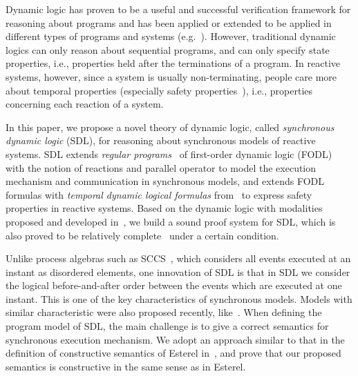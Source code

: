 \documentclass{fcs}
\begin{document}
Dynamic logic has proven to be a useful and successful verification framework for reasoning about programs and has been applied or extended to be applied in
different types of programs and systems (e.g.~\cite{Feldman84,Rustan07,Platzer07b,Platzer07}).
However, traditional dynamic logics can only reason about sequential programs, and can only specify state properties, i.e., properties held after the terminations of a program.
In reactive systems, however, since a system is usually non-terminating, people care more about temporal properties (especially safety properties~\cite{Halbwachs91}), i.e., properties concerning each reaction of a system.

In this paper, we propose a novel theory of dynamic logic, called \emph{synchronous dynamic logic} (SDL), for reasoning about synchronous models of reactive systems.
SDL extends \emph{regular programs}~\cite{Harel00} of first-order dynamic logic (FODL)~\cite{Harel79} with the notion of reactions and parallel operator to model the execution mechanism and communication in synchronous models,
and extends FODL formulas with \emph{temporal dynamic logical formulas} from~\cite{Platzer07} to express safety properties in reactive systems.
Based on the dynamic logic with modalities proposed and developed in~\cite{Beckert01},
we build a sound proof system for SDL, which is also proved to be relatively complete~\cite{Cook78} under a certain condition.

Unlike process algebras such as SCCS~\cite{Milner83}, which considers all events executed at an instant as disordered elements,
one innovation of SDL is that in SDL we consider the logical before-and-after order between the events which are executed at one instant. This is one of the key characteristics of synchronous models.
Models with similar characteristic were also proposed recently, like~\cite{Lohstroh19}.
When defining the program model of SDL, the main challenge is to give a correct semantics for synchronous execution mechanism.
We adopt an approach similar to that in the definition of constructive semantics of Esterel in~\cite{Berry99}, and prove that our proposed semantics is constructive in the same sense as in Esterel.
\end{document}
